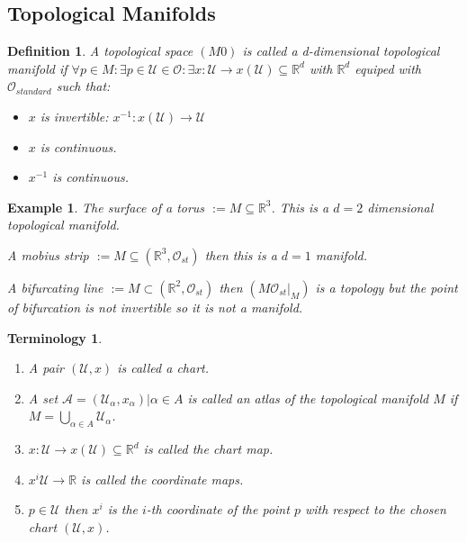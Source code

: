 \documentclass[10pt, oneside]{article}
\newcommand{\R}{\mathbb{R}}
\newtheorem{defn}{Definition}
\newtheorem{example}{Example}
\newtheorem{Terminology}{Terminology}
\begin{document}
     \subsection{Topological Manifolds}
        \begin{defn}
           A topological space $(M \mathcal{0})$ is called a d-dimensional topological manifold if $\forall p \in M: \exists p \in \mathcal{U} \in \mathcal{O} : \exists x:\mathcal{U} \to x(\mathcal{U}) \subseteq \R^d$ with $\R^d$ equiped with $\mathcal{O}_{standard}$ such that:
           \begin{itemize}
              \item $x$ is invertible: $x^{-1}: x(\mathcal{U}) \to \mathcal{U}$
              \item $x$ is continuous.
              \item $x^{-1}$ is continuous.
           \end{itemize}
        \end{defn}
        \begin{example}
           \item The surface of a torus $:= M \subseteq \R^3$. This is a $d=2$ dimensional topological manifold.
           \item A mobius strip $:= M \subseteq (\R^3,\mathcal{O}_{st})$ then this is a $d=1$ manifold.
           \item A bifurcating line $:= M \subset (\R^2,\mathcal{O}_{st})$ then $(M \mathcal{O}_{st}|_{M})$ is a topology but the point of bifurcation is not invertible so it is not a manifold.
        \end{example}
        \begin{Terminology}
           \begin{enumerate}
              \item A pair $(\mathcal{U},x)$ is called a chart.
              \item A set $\mathcal{A}={(\mathcal{U_\alpha},x_{\alpha})|\alpha \in A}$ is called an atlas of the topological manifold $M$ if $M = \bigcup_{\alpha \in A} \mathcal{U}_\alpha$.
              \item $x:\mathcal{U} \to x(\mathcal{U}) \subseteq \R^d$ is called the chart map.
              \item $x^{i} \mathcal{U} \to \R$ is called the coordinate maps.
              \item $p \in \mathcal{U}$ then $x^{i}$ is the $i$-th coordinate of the point $p$ with respect to the chosen chart $(\mathcal{U},x)$.
           \end{enumerate}
        \end{Terminology}
\end{document}

